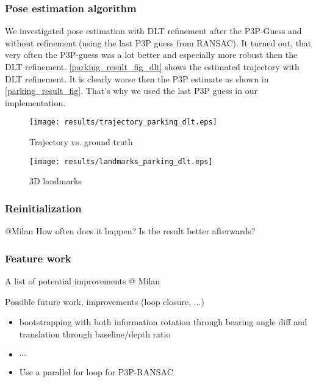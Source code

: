 \subsubsection{Pose estimation algorithm}
We investigated pose estimation with DLT refinement after the P3P-Guess and without refinement (using the last P3P guess from RANSAC). It turned out, that very often the P3P-guess was a lot better and especially more robust then the DLT refinement. \cref{parking_result_fig_dlt} shows the estimated trajectory with DLT refinement. It is clearly worse then the P3P estimate as shown in \cref{parking_result_fig}. That's why we used the last P3P guess in our implementation.
\begin{figure*}[ht!]
    \centering
    \begin{subfigure}[t]{0.5\textwidth}
        \centering
        \texttt{[image: results/trajectory\_parking\_dlt.eps]} 
        \caption{Trajectory vs. ground truth}
    \end{subfigure} 
    \begin{subfigure}[t]{0.5\textwidth}
        \centering
        \texttt{[image: results/landmarks\_parking\_dlt.eps]}
        \caption{3D landmarks}
    \end{subfigure}
    \caption{Parking Dataset Results with DLT refinement}
		\label{parking_result_fig_dlt}
\end{figure*}

\subsubsection{Reinitialization}
@Milan
How often does it happen? Is the result better afterwards?

\subsubsection{Feature work}
A list of potential improvements
@ Milan

Possible future work, improvements (loop closure, ...)

\begin{itemize}
\item bootstrapping with both information rotation through bearing angle diff and translation through baseline/depth ratio
\item $\cdots$
\item Use a parallel for loop for P3P-RANSAC
\end{itemize}
